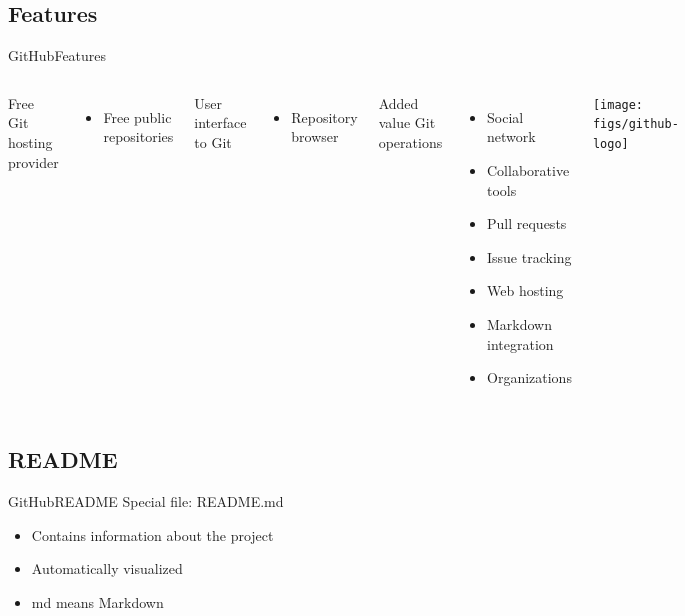 \documentclass[10pt,compress]{beamer} %
\begin{document}
\subsection{Features}
\begin{frame}{GitHub}{Features}
	\begin{columns}
		Free Git hosting provider
		\begin{itemize}
			\item Free public repositories
		\end{itemize}
		User interface to Git
		\begin{itemize}
			\item Repository browser
		\end{itemize}
		Added value Git operations
		\begin{itemize}
			\item Social network
			\item Collaborative tools
			\item Pull requests	
			\item Issue tracking
			\item Web hosting
			\item Markdown integration
			\item Organizations
		\end{itemize}
	\begin{center}
 		\texttt{[image: figs/github-logo]}
	\end{center}
	\end{columns}
\end{frame}

\subsection{README}
\begin{frame}{GitHub}{README}
	Special file: README.md
	\begin{itemize}
		\item Contains information about the project
		\item Automatically visualized
		\item md means Markdown
	\end{itemize}
\end{frame}
\end{document}
